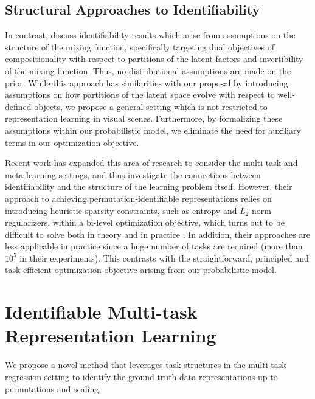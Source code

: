 \documentclass[10pt]{article} %
\theoremstyle{plain}
\theoremstyle{definition}
\begin{document}
\subsection{Structural Approaches to Identifiability}
In contrast, \citet{Brady_Zimmermann_Sharma_Schölkopf_von_Kugelgen_Brendel_2023} discuss identifiability results which arise from assumptions on the structure of the mixing function, specifically targeting dual objectives of compositionality with respect to partitions of the latent factors and invertibility of the mixing function. Thus, no distributional assumptions are made on the prior. While this approach has similarities with our proposal by introducing assumptions on how partitions of the latent space evolve with respect to well-defined objects, we propose a general setting which is not restricted to representation learning in visual scenes. Furthermore, by formalizing these assumptions within our probabilistic model, we eliminate the need for auxiliary terms in our optimization objective. 

Recent work \citep{Lachapelle_Deleu_Mahajan_Mitliagkas_Bengio_Lacoste-Julien_Bertrand_2023, Fumero_Wenzel_Zancato_Achille_Rodolà_Soatto_Schölkopf_Locatello_2023} has expanded this area of research to consider the multi-task and meta-learning settings, and thus investigate the connections between identifiability and the structure of the learning problem itself. However, their approach to achieving permutation-identifiable representations relies on introducing heuristic sparsity constraints, such as entropy and $L_2$-norm regularizers, within a bi-level optimization objective, which turns out to be difficult to solve both in theory and in practice \citep{sinha2017review}. In addition, their approaches are less applicable in practice since a huge number of tasks are required (more than $10^5$ in their experiments). This contrasts with the straightforward, principled and task-efficient optimization objective arising from our probabilistic model.

\section{Identifiable Multi-task Representation Learning}\label{sec:proposed_method}

We propose a novel method that leverages task structures in the multi-task regression setting to identify the ground-truth data representations up to permutations and scaling.
\end{document}
